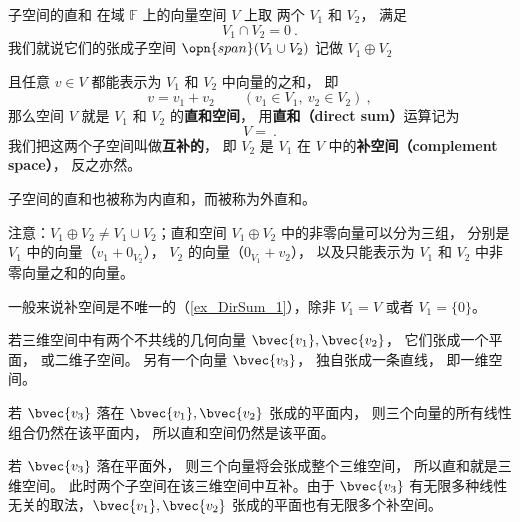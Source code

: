 
\begin{issues}
\issueTODO
\end{issues}



\begin{definition}{子空间的直和}\label{def_DirSum_1}
在域 $\mathbb F$ 上的向量空间 $V$ 上取 两个 $V_1$ 和 $V_2$， 满足
\begin{equation}
V_1 \cap V_2 = \qty{0}~.
\end{equation}
我们就说它们的张成子空间 $\opn{span} (V_1 \cup V_2)$ 记做 $V_1 \oplus V_2$

且任意 ${v} \in V$ 都能表示为 $V_1$ 和 $V_2$ 中向量的之和， 即
\begin{equation}\label{eq_DirSum_2}
v = v_1 + v_2
\qquad
(v_1 \in V_1,\ v_2 \in V_2)~,
\end{equation}
那么空间 $V$ 就是 $V_1$ 和 $V_2$ 的\textbf{直和空间}， 用\textbf{直和（direct sum）}运算记为
\begin{equation}
V = ~.
\end{equation}
我们把这两个子空间叫做\textbf{互补的}， 即 $V_2$ 是 $V_1$ 在 $V$ 中的\textbf{补空间（complement space）}， 反之亦然。
\end{definition}

子空间的直和也被称为内直和，而被称为外直和。


注意：$V_1 \oplus V_2 \neq V_1 \cup V_2$；直和空间 $V_1 \oplus V_2$ 中的非零向量可以分为三组， 分别是 $V_1$ 中的向量（$v_1 + 0_{V_2}$）， $V_2$ 的向量（$0_{V_1} + v_2$）， 以及只能表示为 $V_1$ 和 $V_2$ 中非零向量之和的向量。

一般来说补空间是不唯一的（\autoref{ex_DirSum_1}），除非 $V_1 = V$ 或者 $V_1 = \{0\}$。

\begin{example}{}\label{ex_DirSum_1}
若三维空间中有两个不共线的几何向量 $\bvec{v_1}, \bvec{v_2}$， 它们张成一个平面， 或二维子空间。 另有一个向量 $\bvec{v_3}$， 独自张成一条直线， 即一维空间。

若 $\bvec{v_3}$ 落在 $\bvec{v_1}, \bvec{v_2}$ 张成的平面内， 则三个向量的所有线性组合仍然在该平面内， 所以直和空间仍然是该平面。

若 $\bvec{v_3}$ 落在平面外， 则三个向量将会张成整个三维空间， 所以直和就是三维空间。 此时两个子空间在该三维空间中互补。由于 $\bvec{v_3}$ 有无限多种线性无关的取法，$\bvec{v_1}, \bvec{v_2}$ 张成的平面也有无限多个补空间。
\end{example}

